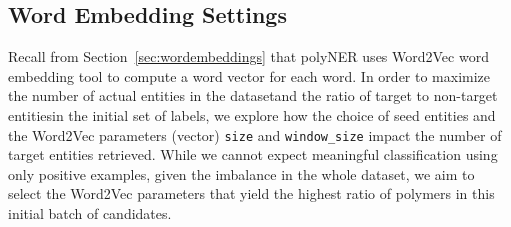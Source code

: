 
\subsection{Word Embedding Settings}\label{sec:wes}
Recall from Section~\ref{sec:wordembeddings} that polyNER uses
 Word2Vec word embedding tool to compute a word vector for each word.
In order to maximize the number of actual entities in the dataset\textemdash and the ratio of target to non-target entities\textemdash in the initial set of labels,
we explore how the choice of seed entities and the Word2Vec parameters (vector) \texttt{size} and \texttt{window_size} impact the number of target entities retrieved. %
While we cannot expect meaningful classification using only positive examples, given the imbalance in the whole dataset, we aim to select the Word2Vec parameters that yield the highest ratio of polymers in this initial batch of candidates.



